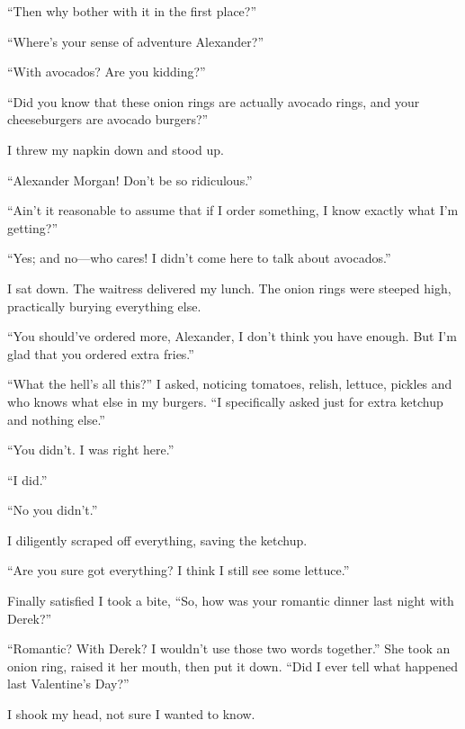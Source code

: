 ``Then why bother with it in the first place?''

``Where's your sense of adventure Alexander?''

``With avocados? Are you kidding?''

``Did you know that these onion rings are actually avocado rings, and
your cheeseburgers are avocado burgers?''

I threw my napkin down and stood up.

``Alexander Morgan! Don't be so ridiculous.''

``Ain't it reasonable to assume that if I order something, I know
exactly what I'm getting?''

``Yes; and no---who cares! I didn't come here to talk about avocados.''

I sat down. The waitress delivered my lunch. The onion rings were
steeped high, practically burying everything else.

``You should've ordered more, Alexander, I don't think you have enough.
But I'm glad that you ordered extra fries.''

``What the hell's all this?'' I asked, noticing tomatoes, relish,
lettuce, pickles and who knows what else in my burgers. ``I specifically
asked just for extra ketchup and nothing else.''

``You didn't. I was right here.''

``I did.''

``No you didn't.''

I diligently scraped off everything, saving the ketchup.

``Are you sure got everything? I think I still see some lettuce.''

Finally satisfied I took a bite, ``So, how was your romantic dinner last
night with Derek?''

``Romantic? With Derek? I wouldn't use those two words together.'' She
took an onion ring, raised it her mouth, then put it down. ``Did I ever
tell what happened last Valentine's Day?''

I shook my head, not sure I wanted to know.

